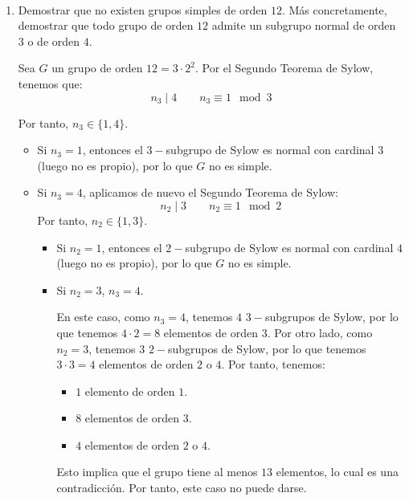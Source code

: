 \begin{ejercicio}\label{ej:6.24}~
    \begin{enumerate}
        \item Demostrar que no existen grupos simples de orden $12$. Más concretamente, demostrar que todo grupo de orden $12$ admite un subgrupo normal de orden $3$ o de orden $4$.
        
        Sea $G$ un grupo de orden $12=3\cdot 2^2$. Por el Segundo Teorema de Sylow, tenemos que:
        \begin{equation*}
            n_3 \mid 4 \qquad n_3 \equiv 1 \mod 3
        \end{equation*}

        Por tanto, $n_3\in \{1,4\}$.
        \begin{itemize}
            \item Si $n_3=1$, entonces el $3-$subgrupo de Sylow es normal con cardinal $3$ (luego no es propio), por lo que $G$ no es simple.
            
            \item Si $n_3=4$, aplicamos de nuevo el Segundo Teorema de Sylow:
            \begin{equation*}
                n_2 \mid 3 \qquad n_2 \equiv 1 \mod 2
            \end{equation*}
            Por tanto, $n_2\in \{1,3\}$.
            \begin{itemize}
                \item Si $n_2=1$, entonces el $2-$subgrupo de Sylow es normal con cardinal $4$ (luego no es propio), por lo que $G$ no es simple.
                \item Si $n_2=3$, $n_3=4$.
                
                En este caso, como $n_3=4$, tenemos $4$ $3-$subgrupos de Sylow, por lo que tenemos $4\cdot 2=8$ elementos de orden $3$. Por otro lado, como $n_2=3$, tenemos $3$ $2-$subgrupos de Sylow, por lo que tenemos $3\cdot 3=4$ elementos de orden $2$ o $4$. Por tanto, tenemos:
                \begin{itemize}
                    \item $1$ elemento de orden $1$.
                    \item $8$ elementos de orden $3$.
                    \item $4$ elementos de orden $2$ o $4$.
                \end{itemize}
                Esto implica que el grupo tiene al menos $13$ elementos, lo cual es una contradicción. Por tanto, este caso no puede darse.
            \end{itemize}
        \end{itemize}


\end{enumerate}
\end{ejercicio}
